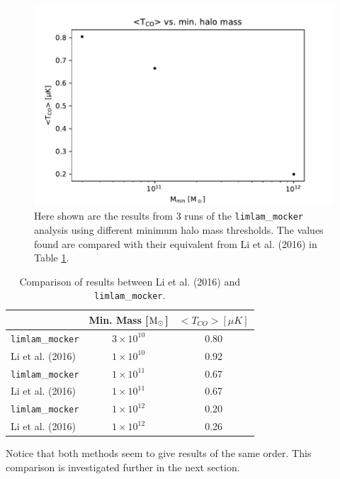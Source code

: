 \documentclass[apj]{emulateapj}
\begin{document}
\begin{figure}[h!]
  \centering
    \includegraphics[width=\linewidth]{tco_coarse.pdf}
  \caption{Here shown are the results from 3 runs of the \texttt{limlam}\_\texttt{mocker} analysis using different minimum halo mass thresholds. The values found are compared with their equivalent from Li et al. (2016) \cite{Li_2016} in Table \ref{tab:val}. }
  \label{fig:tco_coarse}
  \end{figure}
  
  
  
  

\begin{table}[h!]
\begin{center}
\begin{threeparttable}
\caption{Comparison of results between Li et al. (2016) \cite{Li_2016} and \texttt{limlam}\_\texttt{mocker}.}
\begin{tabular}{|l|c|c|}
\hline 
   & Min. Mass [$\rm{M_\odot}$] & $<T_{CO}> [\mu K]$ \\
 \hline  
\texttt{limlam}\_\texttt{mocker} & $3 \times 10^{10}$ & 0.80 \\
Li et al. (2016) \cite{Li_2016} & $1 \times 10^{10}$ & 0.92 \\
\hline
\texttt{limlam}\_\texttt{mocker} & $1 \times 10^{11}$ & 0.67 \\
Li et al. (2016) \cite{Li_2016} & $1 \times 10^{11}$ & 0.67 \\
\hline 
\texttt{limlam}\_\texttt{mocker} & $1 \times 10^{12}$ & 0.20 \\
Li et al. (2016) \cite{Li_2016} & $1 \times 10^{12}$ & 0.26 \\
\hline 
\end{tabular} 
\vskip 2mm
\begin{tablenotes} \item  
\begin{center}
\begin{flushleft}
Notice that both methods seem to give results of the same order. This comparison is investigated further in the next section.
\end{flushleft}
\end{center}
\end{tablenotes}
\label{tab:vitalStats_kappa}
\end{threeparttable}
\end{center}
\label{tab:val}
\end{table}
\end{document}
